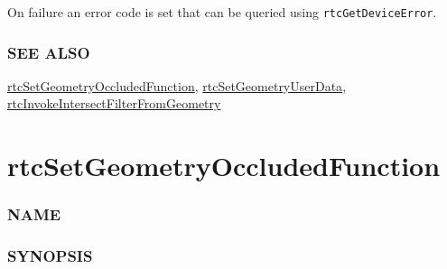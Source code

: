 On failure an error code is set that can be queried using
\texttt{rtcGetDeviceError}.

\subsubsection{SEE ALSO}\label{see-also}

\hyperref[rtcsetgeometryoccludedfunction]{rtcSetGeometryOccludedFunction},
\hyperref[rtcsetgeometryuserdata]{rtcSetGeometryUserData},
\hyperref[rtcinvokeintersectfilterfromgeometry]{rtcInvokeIntersectFilterFromGeometry}

\pagebreak

\section{rtcSetGeometryOccludedFunction}\label{rtcsetgeometryoccludedfunction}

\subsubsection{NAME}\label{name}

\begin{Shaded}
\begin{Highlighting}[]
\OperatorTok{{-}}
\end{Highlighting}
\end{Shaded}

\subsubsection{SYNOPSIS}\label{synopsis}

